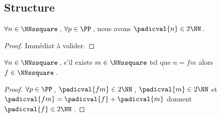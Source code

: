 \subsection{Structure}




\leavevmode
\smallskip

\begin{fact} \label{prime-square}
	$\forall n \in \NNssquare$\,,
	$\forall p \in \PP$\,,
	nous avons 
	$\padicval{n} \in 2 \NN$\,.
\end{fact}


\begin{proof}
	Immédiat à valider.
\end{proof}




\begin{fact} \label{facto-square}
	$\forall n \in \NNssquare$\,, s'il existe $m \in \NNssquare$ tel que $n =  f m$ alors $f  \in \NNssquare$\,.
\end{fact}


\begin{proof}
	$\forall p \in \PP$\,, 
	$\padicval{f m} \in 2 \NN$\,,
	$\padicval{m} \in 2 \NN$
	et
	$\padicval{f m} = \padicval{f} + \padicval{m}$
	donnent
	$\padicval{f} \in 2 \NN$\,.
\end{proof}


%
%
%
%


%
%
%


